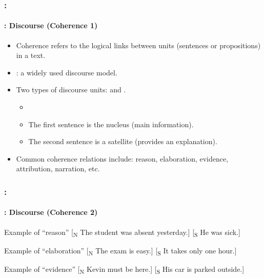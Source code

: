 \documentclass[xcolor=table]{beamer}
\begin{document}
\begin{frame}
	\frametitle{\insertshortsubtitle: \insertsection}
	\framesubtitle{\insertsubsection: Discourse (Coherence 1)}
	
	\begin{itemize}
		\item Coherence refers to the logical links between units (sentences or propositions) in a text.
		\item {}: a widely used discourse model.
		\item Two types of discourse units:  and .
		\begin{itemize}
			\item {}
			\item The first sentence is the nucleus (main information).
			\item The second sentence is a satellite (provides an explanation).
		\end{itemize}
		\item Common coherence relations include: reason, elaboration, evidence, attribution, narration, etc.
	\end{itemize}
	
\end{frame}

\begin{frame}
	\frametitle{\insertshortsubtitle: \insertsection}
	\framesubtitle{\insertsubsection: Discourse (Coherence 2)}

	\begin{exampleblock}{Example of ``reason''}
		[\textsubscript{N} The student was absent yesterday.] [\textsubscript{S} He was sick.]
	\end{exampleblock}

	\vfill
	
	\begin{exampleblock}{Example of ``elaboration''}
		[\textsubscript{N} The exam is easy.] [\textsubscript{S} It takes only one hour.]
	\end{exampleblock}

	\vfill
	
	\begin{exampleblock}{Example of ``evidence''}
		[\textsubscript{N} Kevin must be here.] [\textsubscript{S} His car is parked outside.]
	\end{exampleblock}

\end{frame}
\end{document}
